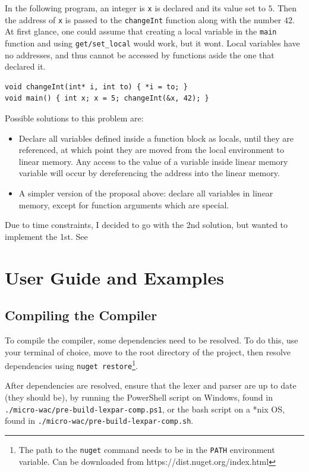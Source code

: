 \documentclass[a4paper]{article}
\begin{document}
In the following program, an integer is \texttt{x} is declared and its value set to $5$. Then the address of \texttt{x} is passed to the \texttt{changeInt} function along with the number $42$. At first glance, one could assume that creating a local variable in the \texttt{main} function and using \texttt{get/set\_local} would work, but it wont. Local variables have no addresses, and thus cannot be accessed by functions aside the one that declared it.
\begin{verbatim}
void changeInt(int* i, int to) { *i = to; }
void main() { int x; x = 5; changeInt(&x, 42); }
\end{verbatim}

Possible solutions to this problem are:
\begin{itemize}
	\item Declare all variables defined inside a function block as locals, until they are referenced, at which point they are moved from the local environment to linear memory. Any access to the value of a variable inside linear memory variable will occur by dereferencing the address into the linear memory.
	\item A simpler version of the proposal above: declare all variables in linear memory, except for function arguments which are special.
\end{itemize}

Due to time constraints, I decided to go with the 2nd solution, but wanted to implement the 1st. See %

\section{User Guide and Examples}
\label{sec:user-guide}

\subsection{Compiling the Compiler}
\label{sec:user-guide:compile-compiler}
To compile the compiler, some dependencies need to be resolved. To do this, use your terminal of choice, move to the root directory of the project, then resolve dependencies using \texttt{nuget restore}\footnote{The path to the \texttt{nuget} command needs to be in the \texttt{PATH} environment variable. Can be downloaded from https://dist.nuget.org/index.html}.

After dependencies are resolved, ensure that the lexer and parser are up to date (they should be), by running the PowerShell script on Windows, found in \texttt{./micro-wac/pre-build-lexpar-comp.ps1}, or the bash script on a *nix OS, found in \texttt{./micro-wac/pre-build-lexpar-comp.sh}.
\end{document}
